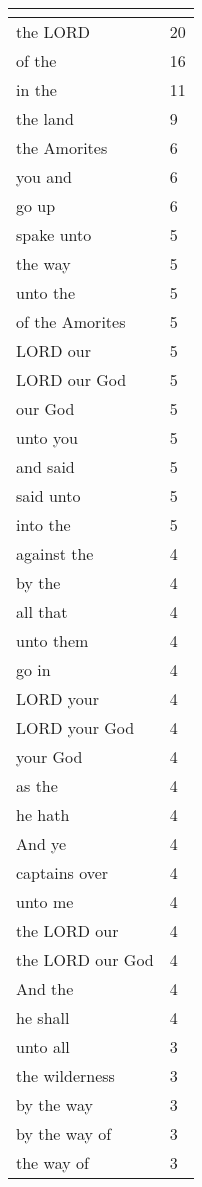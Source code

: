 \begin{center}
\begin{longtable}{|p{3.0in}|p{0.5in}|}
\hline \multicolumn{2}{c}{{ }} \\ \hline
\endfoot 
the LORD & 20\\ \hline 
of the & 16\\ \hline 
in the & 11\\ \hline 
the land & 9\\ \hline 
the Amorites & 6\\ \hline 
you and & 6\\ \hline 
go up & 6\\ \hline 
spake unto & 5\\ \hline 
the way & 5\\ \hline 
unto the & 5\\ \hline 
of the Amorites & 5\\ \hline 
LORD our & 5\\ \hline 
LORD our God & 5\\ \hline 
our God & 5\\ \hline 
unto you & 5\\ \hline 
and said & 5\\ \hline 
said unto & 5\\ \hline 
into the & 5\\ \hline 
against the & 4\\ \hline 
by the & 4\\ \hline 
all that & 4\\ \hline 
unto them & 4\\ \hline 
go in & 4\\ \hline 
LORD your & 4\\ \hline 
LORD your God & 4\\ \hline 
your God & 4\\ \hline 
as the & 4\\ \hline 
he hath & 4\\ \hline 
And ye & 4\\ \hline 
captains over & 4\\ \hline 
unto me & 4\\ \hline 
the LORD our & 4\\ \hline 
the LORD our God & 4\\ \hline 
And the & 4\\ \hline 
he shall & 4\\ \hline 
unto all & 3\\ \hline 
the wilderness & 3\\ \hline 
by the way & 3\\ \hline 
by the way of & 3\\ \hline 
the way of & 3\\ \hline 

\end{longtable}
\end{center}
